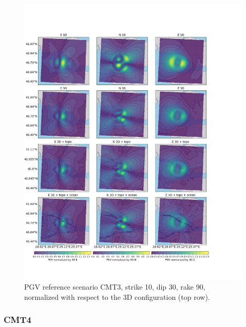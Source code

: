 \documentclass[../Text/00main.tex]{subfiles}
\begin{document}
\begin{figure}[h]
    \centering
    \includegraphics[width=1\linewidth]{images_results/Ref_scenarios_normalized_sc3.png}
    \caption{PGV reference scenario CMT3, strike 10, dip 30, rake 90, normalized with respect to the 3D configuration (top row).}
    \label{fig:ref_CMT3}
\end{figure}

\FloatBarrier

\subsubsection{CMT4}
\end{document}
